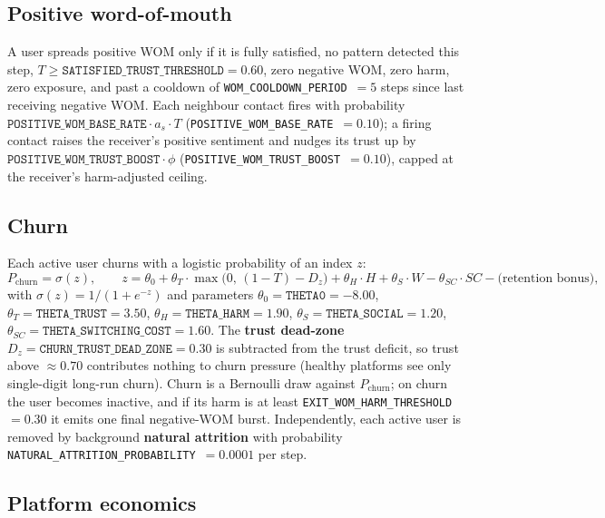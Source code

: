 \documentclass[11pt]{article}
\newcommand{\code}[1]{\texttt{#1}}
\begin{document}
\subsection{Positive word-of-mouth}
\label{sub:poswom}

A user spreads positive WOM only if it is fully satisfied, no pattern detected
this step, $T \ge \code{SATISFIED\_TRUST\_THRESHOLD} = 0.60$, zero negative WOM,
zero harm, zero exposure, and past a cooldown of
\code{WOM\_COOLDOWN\_PERIOD}~$=5$ steps since last receiving negative WOM. Each
neighbour contact fires with probability
$\code{POSITIVE\_WOM\_BASE\_RATE}\cdot a_s \cdot T$
(\code{POSITIVE\_WOM\_BASE\_RATE}~$=0.10$); a firing contact raises the
receiver's positive sentiment and nudges its trust up by
$\code{POSITIVE\_WOM\_TRUST\_BOOST}\cdot\phi$
(\code{POSITIVE\_WOM\_TRUST\_BOOST}~$=0.10$), capped at the receiver's
harm-adjusted ceiling.

\subsection{Churn}
\label{sub:churn}

Each active user churns with a logistic probability of an index $z$:
\[
P_{\text{churn}} = \sigma(z),\qquad
z = \theta_0
+ \theta_T \cdot \max\!\big(0,\, (1-T) - D_z\big)
+ \theta_H \cdot H
+ \theta_S \cdot W
- \theta_{SC}\cdot SC
- \text{(retention bonus)} ,
\]
with $\sigma(z) = 1/(1+e^{-z})$ and parameters
$\theta_0 = \code{THETA0} = -8.00$,
$\theta_T = \code{THETA\_TRUST} = 3.50$,
$\theta_H = \code{THETA\_HARM} = 1.90$,
$\theta_S = \code{THETA\_SOCIAL} = 1.20$,
$\theta_{SC} = \code{THETA\_SWITCHING\_COST} = 1.60$. The
\textbf{trust dead-zone} $D_z = \code{CHURN\_TRUST\_DEAD\_ZONE} = 0.30$ is
subtracted from the trust deficit, so trust above $\approx0.70$ contributes
nothing to churn pressure (healthy platforms see only single-digit long-run
churn). Churn is a Bernoulli draw against $P_{\text{churn}}$; on churn the user
becomes inactive, and if its harm is at least
\code{EXIT\_WOM\_HARM\_THRESHOLD}~$=0.30$ it emits one final negative-WOM burst.
Independently, each active user is removed by background \textbf{natural
attrition} with probability \code{NATURAL\_ATTRITION\_PROBABILITY}~$=0.0001$ per
step.

\subsection{Platform economics}
\label{sub:economics}
\end{document}
